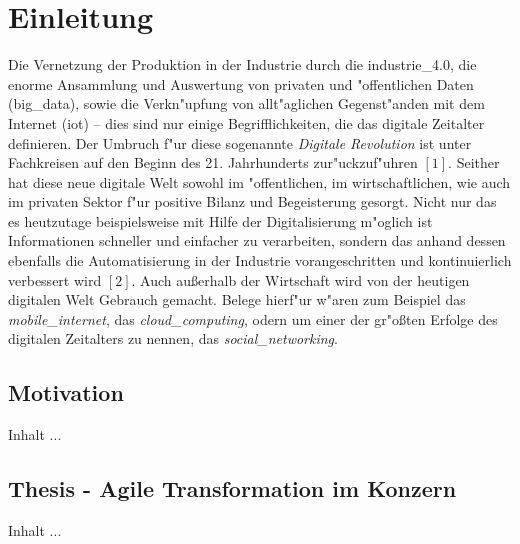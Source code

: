 
\chapter{Einleitung}
\minitoc
\vspace{1 cm} 

Die Vernetzung der Produktion in der Industrie durch die \gls{industrie_4.0}, die enorme Ansammlung und Auswertung von privaten 
und "offentlichen Daten (\gls{big_data}), sowie die Verkn"upfung von allt"aglichen Gegenst"anden mit dem Internet (\gls{iot}) 
-- dies sind nur einige Begrifflichkeiten, die das digitale Zeitalter definieren. Der Umbruch f"ur diese sogenannte \textit{Digitale Revolution} ist unter Fachkreisen auf den Beginn des 21. Jahrhunderts zur"uckzuf"uhren \([1]\). Seither hat diese neue digitale Welt sowohl im "offentlichen, im wirtschaftlichen, wie auch im privaten Sektor f"ur positive Bilanz und Begeisterung gesorgt. Nicht nur das es heutzutage beispielsweise mit Hilfe der Digitalisierung m"oglich ist Informationen schneller und einfacher zu verarbeiten, sondern das anhand dessen ebenfalls die Automatisierung in der Industrie vorangeschritten und kontinuierlich verbessert wird \([2]\). Auch au\ss{}erhalb der Wirtschaft wird von der heutigen digitalen Welt Gebrauch gemacht. Belege hierf"ur w"aren zum Beispiel das \textit{\gls{mobile_internet}}, das \textit{\gls{cloud_computing}}, odern um einer der gr"o\ss{}ten Erfolge des digitalen Zeitalters zu nennen, das \textit{\gls{social_networking}}. 


\section{Motivation}
Inhalt ...

\section{Thesis - Agile Transformation im Konzern}
Inhalt ...




